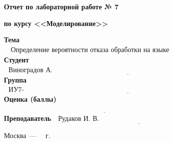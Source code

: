 \begin{titlepage}
	
	\begin{center}
		\Large\textbf{Отчет по лабораторной работе № 7}
		
		\Large\textbf{по курсу <<Моделирование>>}
		
		\textbf{\newline}		
	\end{center}
	
	\noindent\textbf{Тема} $\underline{\text{~~ Определение вероятности отказа обработки на языке GPSS~~~~~~~~~~~~~~~~~~~~~~~~~~~~~~~~~~~~~~~~~~~~~~~~~~~~~~~~~~~~~~~~~~~~~~~~}}$\newline\newline
	\noindent\textbf{Студент} $\underline{\text{~~Виноградов А. О.~~~~~~~~~~~~~~~~~~~~~~~~~~~~~~~~~~~~~~~~~~~~~~~~~~~~~~~~~~~~~~~~~~~~~~~~~~~~~~~~~~~~~~}}$\newline\newline
	\noindent\textbf{Группа} $\underline{\text{~~ИУ7-76Б~~~~~~~~~~~~~~~~~~~~~~~~~~~~~~~~~~~~~~~~~~~~~~~~~~~~~~~~~~~~~~~~~~~~~~~~~~~~~~~~~~~~~~~~~~~~~~~~~~~~}}$\newline\newline
	\noindent\textbf{Оценка (баллы)} $\underline{\textbf{~~~~~~~~~~~~~~~~~~~~~~~~~~~~~~~~~~~~~~~~~~~~~~~~~~~~~~~~~~~~~~~~~~~~~~~~~~~~~~~~~~~~~~~~}}$\newline\newline
	\noindent\textbf{Преподаватель} $\underline{\text{~~Рудаков И. В.~~~~~~~~~~~~~~~~~~~~~~~~~~~~~~~~~~~~~~~~~~~~~~~~~~~~~~~}}$\newline
	
	\begin{center}
		\vfill
		Москва~---~\the\year
		~г.
	\end{center}
	\restoregeometry
	
\end{titlepage}